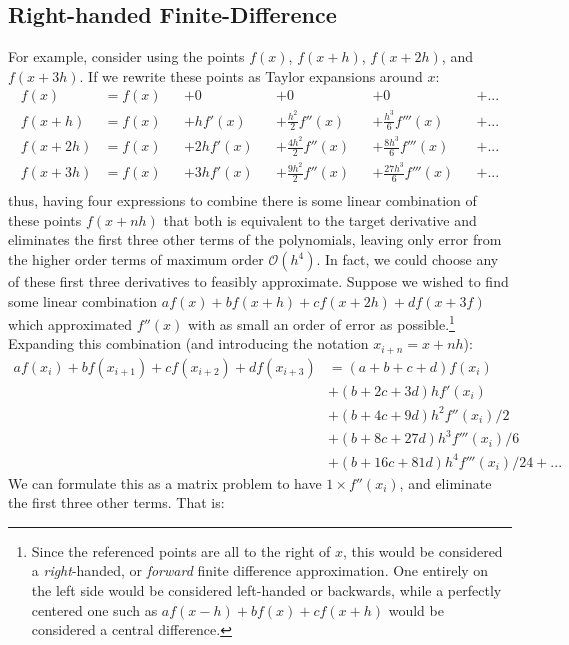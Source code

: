 \documentclass[12pt]{article}
\newcommand{\bigO}{\mathcal{O}}
\begin{document}
\subsection{Right-handed Finite-Difference}
For example, consider using the points $f(x)$, $f(x+h)$, $f(x+2h)$, and $f(x+3h)$. %
If we rewrite these points as Taylor expansions around $x$:
\begin{align}
    f(x) &= f(x) && + 0 && + 0 && + 0 && + ...\\
    f(x+h) &= f(x) &&+ hf'(x) &&+ \frac{h^2}{2}f''(x) &&+ \frac{h^3}{6}f'''(x) &&+...\\
    f(x+2h) &= f(x) &&+ 2hf'(x) &&+ \frac{4h^2}{2}f''(x) &&+ \frac{8h^3}{6}f'''(x) &&+...\\
    f(x+3h) &= f(x) &&+ 3hf'(x) &&+ \frac{9h^2}{2}f''(x) &&+ \frac{27h^3}{6}f'''(x) &&+...\\
\end{align}
thus, having four expressions to combine there is some linear combination of these points $f(x+nh)$ that both is equivalent to the target derivative and eliminates the first three other terms of the polynomials, leaving only error from the higher order terms of maximum order $\bigO(h^4)$.
In fact, we could choose any of these first three derivatives to feasibly approximate.
Suppose we wished to find some linear combination $af(x) + bf(x+h)+cf(x+2h)+df(x+3f)$ which approximated $f''(x)$ with as small an order of error as possible.\footnote{Since the referenced points are all to the right of $x$, this would be considered a \emph{right}-handed, or \emph{forward} finite difference approximation. One entirely on the left side would be considered left-handed or backwards, while a perfectly centered one such as $af(x-h)+bf(x)+cf(x+h)$ would be considered a central difference.}
Expanding this combination (and introducing the notation $x_{i+n}=x+nh$):
\begin{align}
    af(x_i) + bf(x_{i+1})+cf(x_{i+2})+df(x_{i+3})
    &=(a+b+c+d)f(x_i)\\
    &+(b + 2c + 3d)hf'(x_i)\nonumber\\
    &+(b + 4c + 9d)h^2f''(x_i)/2\nonumber\\
    &+(b + 8c + 27d)h^3f'''(x_i)/6\nonumber\\
    &+(b + 16c + 81d)h^4f'''(x_i)/24+...\nonumber
\end{align}
We can formulate this as a matrix problem to have $1\times f''(x_i)$, and eliminate the first three other terms.
That is:
\end{document}
